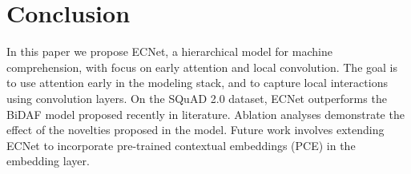 \section{Conclusion}
\label{sec:conclusion}

In this paper we propose ECNet, a hierarchical model for machine comprehension, with focus on early attention and local convolution. The goal is to use attention early in the modeling stack, and to capture local interactions using convolution layers. On the SQuAD 2.0 dataset, ECNet outperforms the BiDAF \cite{seo2016bidirectional} model proposed recently in literature.  Ablation analyses demonstrate the effect of the novelties proposed in the model. Future work involves extending ECNet to incorporate pre-trained contextual embeddings (PCE) in the embedding layer. 

